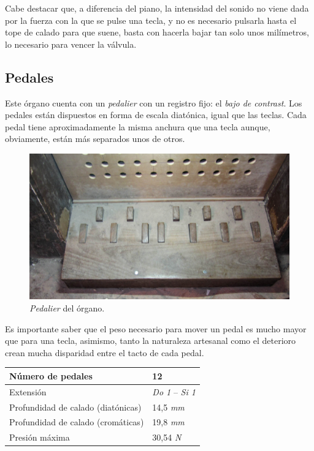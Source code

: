 \smallskip

Cabe destacar que, a diferencia del piano, la intensidad del sonido no viene dada por la fuerza con la que se pulse una tecla, y no es necesario pulsarla hasta el tope de calado para que suene, basta con hacerla bajar tan solo unos milímetros, lo necesario para vencer la válvula.

\subsection{Pedales}

Este órgano cuenta con un \textit{pedalier} con un registro fijo: el \textit{bajo de contrast}. Los pedales están dispuestos en forma de escala diatónica, igual que las teclas. Cada pedal tiene aproximadamente la misma anchura que una tecla aunque, obviamente, están más separados unos de otros.

\smallskip

\begin{figure}[H]
	\noindent \begin{centering}
		\includegraphics[width=\linewidth*3/4]{capitulo3/pedalier}
		\par\end{centering}
	\smallskip
	\caption{\label{fig:pedalier} \textit{Pedalier} del órgano.}
\end{figure} 

\smallskip

Es importante saber que el peso necesario para mover un pedal es mucho mayor que para una tecla, asimismo, tanto la naturaleza artesanal como el deterioro crean mucha disparidad entre el tacto de cada pedal.

\smallskip

\begin{center}
	\begin{tabular}{|l|l|}
		\hline Número de pedales & 12 \\ 
		\hline Extensión & \textit{Do 1} -- \textit{Si 1} \\ 
		\hline Profundidad de calado (diatónicas) & 14,5 \textit{mm} \\ 
		\hline Profundidad de calado (cromáticas) & 19,8 \textit{mm} \\
		\hline Presión máxima & 30,54 \textit{N} \\
		\hline 
	\end{tabular}
	\smallskip
\end{center}


